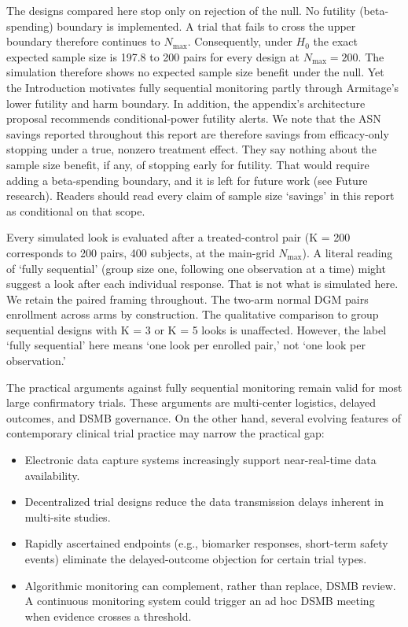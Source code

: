 \documentclass[
  11pt,
]{article}
\providecommand{\tightlist}{%
  \setlength{\itemsep}{0pt}\setlength{\parskip}{0pt}}
\begin{document}
The designs compared here stop only on rejection of the
null. No futility (beta-spending) boundary is
implemented. A trial that fails to cross the upper
boundary therefore continues to \(N_{\max}\).
Consequently, under \(H_0\) the exact expected sample
size is
197.8
to 200 pairs for every design at \(N_{\max} = 200\). The simulation therefore shows no
expected sample size benefit under the null. Yet the
Introduction motivates fully sequential monitoring
partly through Armitage's lower futility and harm
boundary. In addition, the appendix's architecture
proposal recommends conditional-power futility alerts.
We note that the ASN savings reported throughout this
report are therefore savings from efficacy-only
stopping under a true, nonzero treatment effect. They
say nothing about the sample size benefit, if any, of
stopping early for futility. That would require adding
a beta-spending boundary, and it is left for future
work (see Future research). Readers should read every
claim of sample size `savings' in this report as
conditional on that scope.

Every simulated look is evaluated after a
treated-control pair (K = 200 corresponds to 200 pairs,
400 subjects, at the main-grid \(N_{\max}\)). A literal
reading of `fully sequential' (group size one,
following one observation at a time) might suggest a
look after each individual response. That is not what
is simulated here. We retain the paired framing
throughout. The two-arm normal DGM pairs enrollment
across arms by construction. The qualitative comparison
to group sequential designs with K = 3 or K = 5 looks
is unaffected. However, the label `fully sequential'
here means `one look per enrolled pair,' not `one look
per observation.'

The practical arguments against fully sequential
monitoring remain valid for most large confirmatory
trials. These arguments are multi-center logistics,
delayed outcomes, and DSMB governance. On the other
hand, several evolving features of contemporary
clinical trial practice may narrow the practical gap:

\begin{itemize}
\tightlist
\item
  Electronic data capture systems increasingly
  support near-real-time data availability.
\item
  Decentralized trial designs reduce the data
  transmission delays inherent in multi-site studies.
\item
  Rapidly ascertained endpoints (e.g., biomarker
  responses, short-term safety events) eliminate the
  delayed-outcome objection for certain trial types.
\item
  Algorithmic monitoring can complement, rather than
  replace, DSMB review. A continuous monitoring
  system could trigger an ad hoc DSMB meeting when
  evidence crosses a threshold.
\end{itemize}
\end{document}
